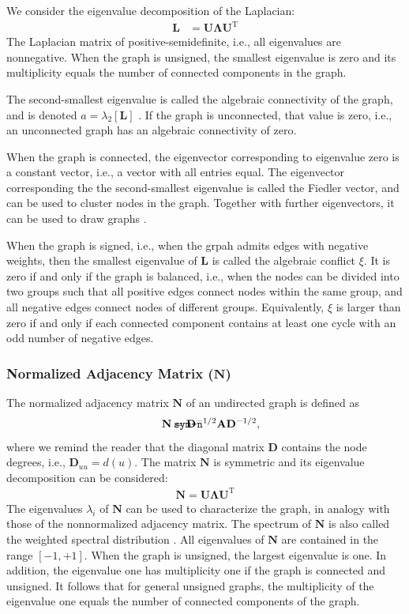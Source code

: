 \documentclass{article}
\def\mathnote#1{%
  \tag*{\rlap{\hspace\marginparsep\smash{\parbox[t]{\marginparwidth}{#1}}}}
}
\begin{document}
We consider the eigenvalue decomposition of the Laplacian:
\begin{align*}
  \mathbf L &= \mathbf U \mathbf \Lambda \mathbf U^{\mathrm T}
\end{align*}
The Laplacian matrix of positive-semidefinite, i.e., all eigenvalues are
nonnegative.  
When the graph is unsigned, the smallest eigenvalue is zero and its
multiplicity equals the number of connected components in the graph. 

The second-smallest eigenvalue is called the algebraic connectivity of
the graph, and is denoted $a = \lambda_2[\mathbf L]$ \citep{b652}.  If the graph is
unconnected, that value is zero, i.e., an unconnected graph has an
algebraic connectivity of zero. 

When the graph is connected, the eigenvector corresponding to eigenvalue
zero is a constant vector, i.e., a vector with all entries equal. The
eigenvector corresponding the the second-smallest eigenvalue is called
the Fiedler vector, and can be used to cluster nodes in the
graph. Together with further eigenvectors, it can be used to draw
graphs \citep{kunegis:signed-kernels}. 

When the graph is signed, i.e., when the grpah admits edges with
negative weights, then the smallest eigenvalue of $\mathbf L$ is called
the algebraic conflict $\xi$. It is zero if and only if the graph is balanced,
i.e., when the nodes can be divided into two groups such that all
positive edges connect nodes within the same group, and all negative
edges connect nodes of different groups.  Equivalently, $\xi$ is larger
than zero if and only if each connected component contains at least one
cycle with an odd number of negative edges. 

\subsubsection{Normalized Adjacency Matrix ($\mathbf N$)}
The normalized adjacency matrix $\mathbf N$ of an undirected graph is
defined as 
\begin{align*}
  \mathnote{\texttt{sym-n}}
  \mathbf N &= \mathbf D^{-1/2} \mathbf A \mathbf D^{-1/2},
\end{align*}
where we remind the reader that the diagonal matrix $\mathbf D$
contains the node degrees, i.e., $\mathbf D_{uu} = d(u)$. 
The matrix $\mathbf N$ is symmetric and its eigenvalue decomposition can
be considered:
\begin{align}
  \mathbf N = \mathbf U \mathbf \Lambda \mathbf U^{\mathrm T}
\end{align}
The eigenvalues $\lambda_i$ of $\mathbf N$ can be used to characterize
the graph, in analogy with those of the nonnormalized adjacency
matrix.
The spectrum of $\mathbf N$ is also called the weighted spectral
distribution \citep{b864}.
All eigenvalues of $\mathbf N$ are contained in the range
$[-1,+1]$.  When the graph is unsigned, the largest eigenvalue is one.
In addition, the eigenvalue one has multiplicity one if the graph is
connected and unsigned.  It follows that for general unsigned graphs,
the multiplicity of the eigenvalue one equals the number of connected
components of the graph. 
\end{document}
